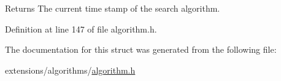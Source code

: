 \begin{DoxyReturn}{Returns}
The current time stamp of the search algorithm. 
\end{DoxyReturn}


Definition at line 147 of file algorithm.\+h.



The documentation for this struct was generated from the following file\+:\begin{DoxyCompactItemize}
\item 
extensions/algorithms/\hyperlink{algorithm_8h}{algorithm.\+h}\end{DoxyCompactItemize}
